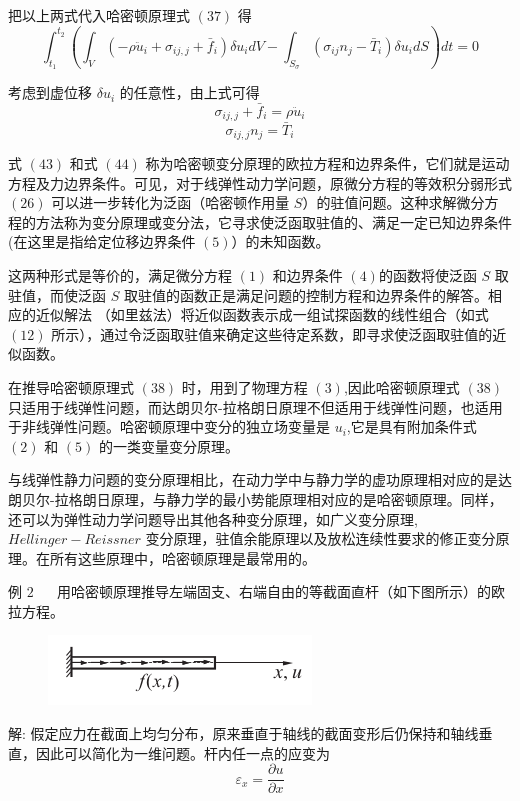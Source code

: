 \documentclass[12pt,a4paper]{article}
\begin{document}
把以上两式代入哈密顿原理式 $(37)$ 得
$$
\int_{t_1}^{t_2}\left(\int_{V}(-\rho\ddot{u}_i+\sigma_{ij,j}+\bar{f}_i)\delta u_idV-\int_{S_{\sigma}}(\sigma_{ij}n_j-\bar{T}_i)\delta u_idS\right)dt=0
$$

考虑到虚位移 $\delta u_i$ 的任意性，由上式可得
\begin{equation}
\sigma_{ij,j}+\bar{f}_i=\rho\ddot{u}_i
\end{equation}
\begin{equation}
\sigma_{ij,j}n_j=\bar{T}_i
\end{equation}

式 $(43)$ 和式 $(44)$ 称为哈密顿变分原理的欧拉方程和边界条件，它们就是运动方程及力边界条件。可见，对于线弹性动力学问题，原微分方程的等效积分弱形式 $(26)$ 可以进一步转化为泛函（哈密顿作用量 $S$）的驻值问题。这种求解微分方程的方法称为变分原理或变分法，它寻求使泛函取驻值的、满足一定已知边界条件 (在这里是指给定位移边界条件 $(5)$）的未知函数。

这两种形式是等价的，满足微分方程 $(1)$ 和边界条件 $(4)$的函数将使泛函 $S$ 取驻值，而使泛函 $S$ 取驻值的函数正是满足问题的控制方程和边界条件的解答。相应的近似解法 （如里兹法）将近似函数表示成一组试探函数的线性组合（如式 $(12)$ 所示），通过令泛函取驻值来确定这些待定系数，即寻求使泛函取驻值的近似函数。

在推导哈密顿原理式 $(38)$ 时，用到了物理方程 $(3)$,因此哈密顿原理式 $(38)$ 只适用于线弹性问题，而达朗贝尔-拉格朗日原理不但适用于线弹性问题，也适用于非线弹性问题。哈密顿原理中变分的独立场变量是 $u_i$,它是具有附加条件式 $(2)$ 和 $(5)$ 的一类变量变分原理。

与线弹性静力问题的变分原理相比，在动力学中与静力学的虚功原理相对应的是达朗贝尔-拉格朗日原理，与静力学的最小势能原理相对应的是哈密顿原理。同样，还可以为弹性动力学问题导出其他各种变分原理，如广义变分原理,$Hellinger-Reissner$ 变分原理，驻值余能原理以及放松连续性要求的修正变分原理。在所有这些原理中，哈密顿原理是最常用的。

例 $2$ ~~ 用哈密顿原理推导左端固支、右端自由的等截面直杆（如下图所示）的欧拉方程。

\begin{figure}[H]
\centering
\includegraphics[scale=0.6]{./figures/6.png}
\caption{}
\end{figure}

解: 假定应力在截面上均匀分布，原来垂直于轴线的截面变形后仍保持和轴线垂直，因此可以简化为一维问题。杆内任一点的应变为
$$
\varepsilon_x=\frac{\partial u}{\partial x}
$$
\end{document}
